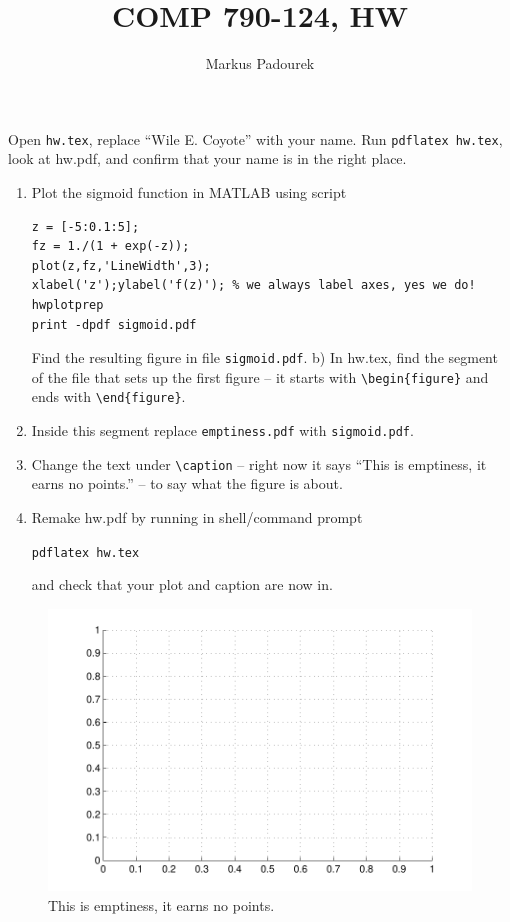 \documentclass{article}
\begin{document}
\author{Markus Padourek}
\title{COMP  790-124, HW\theHW}
\maketitle



\newproblem{0.01pt} Open \texttt{hw\theHW.tex}, replace ``Wile E. Coyote'' with your name. Run
\texttt{pdflatex hw\theHW.tex}, look at hw\theHW.pdf, and confirm that your name is in the right place.


\newproblem{1pt}
\begin{enumerate}
\item Plot the sigmoid function in MATLAB using script
\begin{verbatim}
z = [-5:0.1:5];
fz = 1./(1 + exp(-z));
plot(z,fz,'LineWidth',3);
xlabel('z');ylabel('f(z)'); % we always label axes, yes we do!
hwplotprep
print -dpdf sigmoid.pdf
\end{verbatim}
Find the resulting figure in file {\tt sigmoid.pdf}.
b) In hw\theHW.tex, find the segment of the file that sets up the first figure -- it starts with {\tt \textbackslash begin\{figure\}} and ends with  {\tt \textbackslash end\{figure\}}.
\item Inside this segment  replace {\tt emptiness.pdf} with {\tt sigmoid.pdf}.
\item Change the text under {\tt \textbackslash caption} -- right now it says ``This is emptiness, it earns no points.'' -- to say what the figure is about.
\item Remake hw\theHW.pdf by running in shell/command prompt

     \texttt{pdflatex hw\theHW.tex}

and check that your plot and caption are now in.
\end{enumerate}


\begin{figure}[H]
\begin{center}
\includegraphics[scale=0.5]{emptiness.pdf}
\caption{This is emptiness, it earns no points.}
\end{center}
\end{figure}
\end{document}

